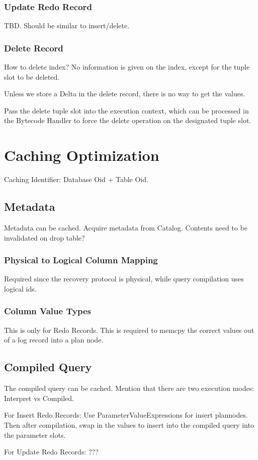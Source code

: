 \documentclass[12pt]{cmuthesis}
\begin{document}
\subsubsection{Update Redo Record}
TBD. Should be similar to insert/delete.
\subsubsection{Delete Record}
How to delete index? No information is given on the index, except for the tuple slot to be deleted.

Unless we store a Delta in the delete record, there is no way to get the values.

Pass the delete tuple slot into the execution context, which can be processed in the Bytecode Handler to force the delete operation on the designated tuple slot.

\section{Caching Optimization}
Caching Identifier: Database Oid + Table Oid.
\subsection{Metadata}
Metadata can be cached. Acquire metadata from Catalog. Contents need to be invalidated on drop table?
\subsubsection{Physical to Logical Column Mapping}
Required since the recovery protocol is physical, while query compilation uses logical ids.
\subsubsection{Column Value Types}
This is only for Redo Records. This is required to memcpy the correct values out of a log record into a plan node.
\subsection{Compiled Query}
The compiled query can be cached. Mention that there are two execution modes: Interpret vs Compiled.

For Insert Redo Records: Use ParameterValueExpressions for insert plannodes. Then after compilation, swap in the values to insert into the compiled query into the parameter slots.

For Update Redo Records: ???
\end{document}
